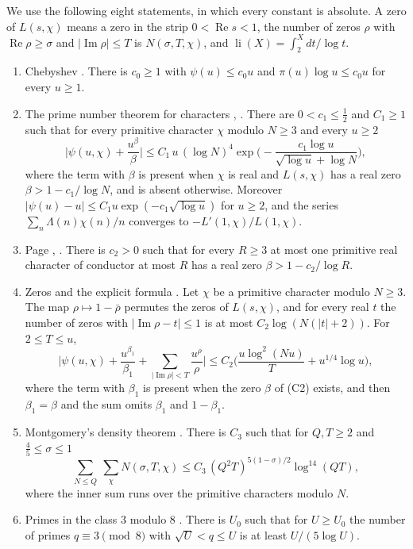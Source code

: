 \documentclass[11pt,letterpaper]{article}
\numberwithin{equation}{section}
\begin{document}
We use the following eight statements, in which every constant is absolute. A zero of $L(s,\chi)$ means a zero in the strip $0<\operatorname{Re}s<1$, the number of zeros $\rho$ with $\operatorname{Re}\rho\ge\sigma$ and $|\operatorname{Im}\rho|\le T$ is $N(\sigma,T,\chi)$, and $\operatorname{li}(X)=\int_2^Xdt/\log t$.
\begin{enumerate}
\item[(C1)] Chebyshev \cite{chebyshev}. There is $c_0\ge1$ with $\psi(u)\le c_0u$ and $\pi(u)\log u\le c_0u$ for every $u\ge1$.
\item[(C2)] The prime number theorem for characters \cite[Theorem~5.27]{ik}, \cite[Ch.~20]{davenport}. There are $0<c_1\le\tfrac12$ and $C_1\ge1$ such that for every primitive character $\chi$ modulo $N\ge3$ and every $u\ge2$
\[
\Big|\psi(u,\chi)+\frac{u^{\beta}}{\beta}\Big|\le C_1\,u\,(\log N)^4\exp\Big(-\frac{c_1\log u}{\sqrt{\log u}+\log N}\Big),
\]
where the term with $\beta$ is present when $\chi$ is real and $L(s,\chi)$ has a real zero $\beta>1-c_1/\log N$, and is absent otherwise. Moreover $|\psi(u)-u|\le C_1u\exp(-c_1\sqrt{\log u})$ for $u\ge2$, and the series $\sum_n\Lambda(n)\chi(n)/n$ converges to $-L'(1,\chi)/L(1,\chi)$.
\item[(C3)] Page \cite{page}, \cite[Ch.~14]{davenport}. There is $c_2>0$ such that for every $R\ge3$ at most one primitive real character of conductor at most $R$ has a real zero $\beta>1-c_2/\log R$.
\item[(C4)] Zeros and the explicit formula \cite[Ch.~16 and~19]{davenport}. Let $\chi$ be a primitive character modulo $N\ge3$. The map $\rho\mapsto1-\bar\rho$ permutes the zeros of $L(s,\chi)$, and for every real $t$ the number of zeros with $|\operatorname{Im}\rho-t|\le1$ is at most $C_2\log(N(|t|+2))$. For $2\le T\le u$,
\[
\Big|\psi(u,\chi)+\frac{u^{\beta_1}}{\beta_1}+\sum_{|\operatorname{Im}\rho|<T}\frac{u^\rho}{\rho}\Big|\le C_2\Big(\frac{u\log^2(Nu)}T+u^{1/4}\log u\Big),
\]
where the term with $\beta_1$ is present when the zero $\beta$ of (C2) exists, and then $\beta_1=\beta$ and the sum omits $\beta_1$ and $1-\beta_1$.
\item[(C5)] Montgomery's density theorem \cite[Theorem~12.2]{montgomerytopics}. There is $C_3$ such that for $Q,T\ge2$ and $\tfrac45\le\sigma\le1$
\[
\sum_{N\le Q}\ \sum_{\chi}N(\sigma,T,\chi)\le C_3\,(Q^2T)^{5(1-\sigma)/2}\log^{14}(QT),
\]
where the inner sum runs over the primitive characters modulo $N$.
\item[(C6)] Primes in the class $3$ modulo $8$ \cite[Ch.~20]{davenport}. There is $U_0$ such that for $U\ge U_0$ the number of primes $q\equiv3\pmod8$ with $\sqrt U<q\le U$ is at least $U/(5\log U)$.

\end{enumerate}
\end{document}
